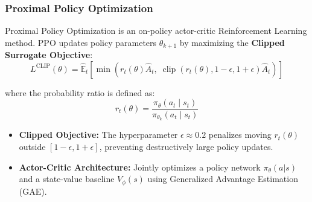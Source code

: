 \documentclass[10pt]{beamer}
\begin{document}
\begin{frame}
    \frametitle{Proximal Policy Optimization}
    Proximal Policy Optimization is an on-policy actor-critic Reinforcement Learning method. PPO updates policy parameters $\theta_{k+1}$ by maximizing the \textbf{Clipped Surrogate Objective}:
    \[
    L^{\text{CLIP}}(\theta) = \hat{\mathbb{E}}_t \left[ \min \left( r_t(\theta)\hat{A}_t, \; \operatorname{clip}(r_t(\theta), 1-\epsilon, 1+\epsilon)\hat{A}_t \right) \right]
    \]
    
    where the probability ratio is defined as:
    \[
    r_t(\theta) = \frac{\pi_\theta(a_t \mid s_t)}{\pi_{\theta_k}(a_t \mid s_t)}
    \]

    \begin{itemize}
        \item \textbf{Clipped Objective:} The hyperparameter $\epsilon \approx 0.2$ penalizes moving $r_t(\theta)$ outside $[1-\epsilon, 1+\epsilon]$, preventing destructively large policy updates.
        \item \textbf{Actor-Critic Architecture:} Jointly optimizes a policy network $\pi_\theta(a|s)$ and a state-value baseline $V_\phi(s)$ using Generalized Advantage Estimation (GAE).
    \end{itemize}
\end{frame}
\end{document}
